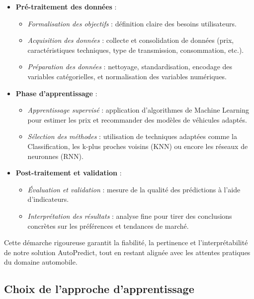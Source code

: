 \documentclass[12pt]{report}
\begin{document}
\begin{itemize}
    \item \textbf{Pré-traitement des données} :
    \begin{itemize}
        \item \textit{Formalisation des objectifs} : définition claire des besoins utilisateurs.
        \item \textit{Acquisition des données} : collecte et consolidation de données (prix, caractéristiques techniques, type de transmission, consommation, etc.).
        \item \textit{Préparation des données} : nettoyage, standardisation, encodage des variables catégorielles, et normalisation des variables numériques.
    \end{itemize}
    
    \item \textbf{Phase d'apprentissage} :
    \begin{itemize}
        \item \textit{Apprentissage supervisé} : application d'algorithmes de Machine Learning pour estimer les prix et recommander des modèles de véhicules adaptés.
        \item \textit{Sélection des méthodes} : utilisation de techniques adaptées comme la Classification, les k-plus proches voisins (KNN) ou encore les réseaux de neuronnes (RNN).
    \end{itemize}
    
    \item \textbf{Post-traitement et validation} :
    \begin{itemize}
        \item \textit{Évaluation et validation} : mesure de la qualité des prédictions à l'aide d'indicateurs.
        \item \textit{Interprétation des résultats} : analyse fine pour tirer des conclusions concrètes sur les préférences et tendances de marché.
    \end{itemize}
\end{itemize}

Cette démarche rigoureuse garantit la fiabilité, la pertinence et l'interprétabilité de notre solution AutoPredict, tout en restant alignée avec les attentes pratiques du domaine automobile.

\subsection{Choix de l'approche d'apprentissage}
\end{document}
